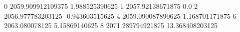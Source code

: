 0 2059.909912109375 1.988525390625
1 2057.92138671875 0.0
2 2056.977783203125 -0.943603515625
4 2059.090087890625 1.168701171875
6 2063.080078125 5.15869140625
8 2071.289794921875 13.368408203125
